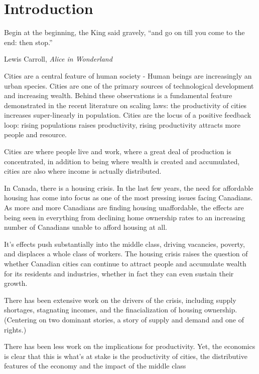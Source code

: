 \chapter{Introduction}

\epigraph{Begin at the beginning, the King said gravely, ``and go on till you come to the end: then stop.''}{Lewis Carroll, \textit{Alice in Wonderland}}


Cities are a central feature of human society - Human beings are increasingly an urban species. Cities are one of the primary sources of technological development and increasing wealth. Behind these observations is a fundamental feature demonstrated in the recent literature on scaling laws: the productivity of cities increases super-linearly in population. Cities are the locus of a positive feedback loop: rising populations raises productivity, rising productivity attracts more people and resource.

Cities are where people live and work, where a great deal of production is concentrated, in addition to being where wealth is created and accumulated, cities are also where income is actually distributed. 

In Canada, there is a housing crisis. In the last few years, the need for affordable housing has come into focus as one of the most pressing issues facing Canadians. As more and more Canadians are finding housing unaffordable, the effects are being seen in everything from declining home ownership rates to an increasing number of Canadians unable to afford housing at all.

It's effects push substantially into the middle class, driving vacancies, poverty, and displaces a whole class of workers.
The housing crisis raises the question of whether Canadian cities can continue to attract people and accumulate wealth for its residents and industries, whether in fact they can even sustain their growth.

There has been extensive work on the drivers of the crisis, including supply shortages, stagnating incomes, and the finacialization of housing ownership.
(Centering on two dominant stories, a story of supply and demand and one of rights.) %

There has been less work on the implications for productivity. 
Yet, the economics is clear that this is what's at stake is the productivity of cities, the distributive features of the economy and the impact of the middle class %

